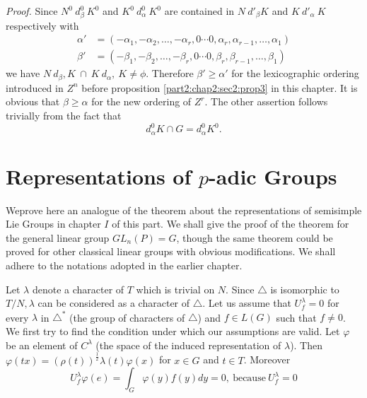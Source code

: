 \noindent \textit{Proof.}%
  Since $N^0~d^0_{\beta}~K^0$ and $K^0~d^0_\alpha~K^0$ are contained
  in $N~d'_\beta K$ and $K~d'_{\alpha}~K$ respectively with 
  \begin{align*}
    \alpha' & = (-\alpha_1,-\alpha_2,\ldots,-\alpha_r,0 \cdots
    0,\alpha_r,\alpha_{r-1},\ldots,\alpha_1)\\ 
    \beta' & = (-\beta_1,-\beta_2,\ldots,-\beta_r,0 \cdots
    0,\beta_r,\beta_{r-1},\ldots,\beta_1) 
  \end{align*}
  we have $N~d_{\beta},K~\cap~K~d_\alpha,~K \neq \phi$. Therefore
  $\beta' \geq \alpha'$ for the lexicographic ordering introduced in
  $Z^n$ before proposition \ref{part2:chap2:sec2:prop3} in this
  chapter. It is obvious that 
  $\beta\geq\alpha$ for the new ordering of $Z^r$. The other assertion
  follows trivially from the fact that 
  \begin{equation*}
    d^0_{\alpha} K \cap G = d^0_\alpha K^0.\tag*{$\Box$}
  \end{equation*}

\section{Representations of $p$-adic Groups}\label{part2:chap2:sec4}

We\pageoriginale prove here an analogue of the theorem about the representations of
semisimple Lie Groups in chapter $I$ of this part. We shall give the
proof of the theorem for the general linear group $GL_n(P) = G$,
though the same theorem could be proved for other classical linear
groups with obvious modifications. We shall adhere to the notations
adopted in the earlier chapter. 

Let $\lambda$ denote a character of $T$ which is trivial on $N$. Since
$\triangle$ is isomorphic to $T/N,\lambda$ can be considered as a
character of $\triangle$. Let us assume that $U^{\lambda}_{f}=0$ for
every $\lambda$ in $\triangle^*$ (the group of characters of
$\triangle$) and $f\in L(G)$ such that $f \neq 0$. We first try to
find the condition under which our assumptions are valid. Let
$\varphi$ be an element of $C^\lambda$ (the space of the
induced representation of $\lambda$). Then $\varphi(tx) =
(\rho(t))^{\frac{1}{2}}\lambda(t)\varphi(x)$ for $x \in G$ and $t \in
T$. Moreover 
\begin{equation*}
  U^{\lambda}_{f}\varphi(e) = \int_G \varphi(y)f(y)dy =
  0,~\text{because}~ U^\lambda_{f} = 0 \tag{I}\label{part2:chap2:sec4:eqI}  
\end{equation*}

